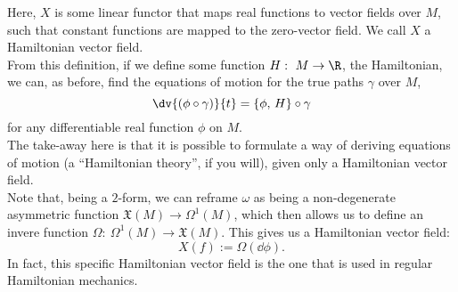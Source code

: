 \documentclass{article}
\begin{document}
\begin{multicols}{2}
\begin{equation}
	\end{equation}
	Here, \(X\) is some linear functor that maps real functions to vector fields over \(M\), such that constant functions are mapped to the zero-vector field. We call \(X\) a Hamiltonian vector field.\\
	From this definition, if we define some function \(H:\ M\to\R\), the Hamiltonian, we can, as before, find the equations of motion for the true paths \(\gamma\) over \(M\),
	\begin{equation}
		\dv{(\phi\circ\gamma)}{t} = \{\phi,\,H\}\circ\gamma
	\end{equation}
	for any differentiable real function \(\phi\) on \(M\).\\
	The take-away here is that it is possible to formulate a way of deriving equations of motion (a ``Hamiltonian theory'', if you will), given only a Hamiltonian vector field.\\
	Note that, being a \(2\)-form, we can reframe \(\omega\) as being a non-degenerate asymmetric function \(\mathfrak{X}(M)\to \Omega^1(M)\), which then allows us to define an invere function \(\Omega:\ \Omega^1(M)\to\mathfrak{X}(M)\).
	This gives us a Hamiltonian vector field:
	\begin{equation}
		X(f) := \Omega(\dd \phi).
	\end{equation}
	In fact, this specific Hamiltonian vector field is the one that is used in regular Hamiltonian mechanics.

\end{multicols}
\end{document}
